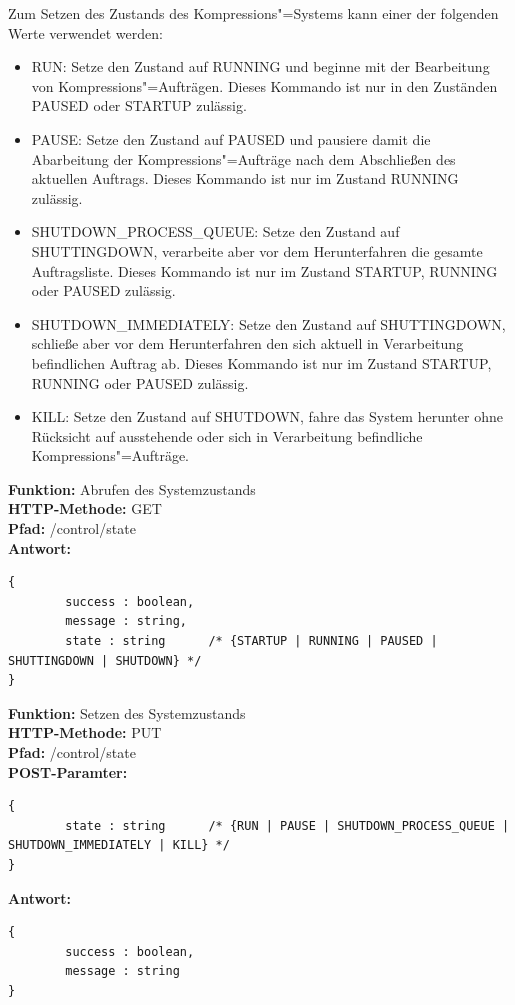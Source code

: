 Zum Setzen des Zustands des Kompressions"=Systems kann einer der folgenden Werte verwendet werden:
\begin{itemize}
\item {\ttfamily RUN:} Setze den Zustand auf {\ttfamily RUNNING} und beginne mit der Bearbeitung von Kompressions"=Aufträgen. Dieses Kommando ist nur in den Zuständen {\ttfamily PAUSED} oder {\ttfamily STARTUP} zulässig.
\item {\ttfamily PAUSE:} Setze den Zustand auf {\ttfamily PAUSED} und pausiere damit die Abarbeitung der Kompressions"=Aufträge nach dem Abschließen des aktuellen Auftrags. Dieses Kommando ist nur im Zustand {\ttfamily RUNNING} zulässig.
\item {\ttfamily SHUTDOWN\_PROCESS\_QUEUE:} Setze den Zustand auf {\ttfamily SHUTTINGDOWN}, verarbeite aber vor dem Herunterfahren die gesamte Auftragsliste. Dieses Kommando ist nur im Zustand {\ttfamily STARTUP}, {\ttfamily RUNNING} oder {\ttfamily PAUSED} zulässig.
\item {\ttfamily SHUTDOWN\_IMMEDIATELY:} Setze den Zustand auf {\ttfamily SHUTTINGDOWN}, schließe aber vor dem Herunterfahren den sich aktuell in Verarbeitung befindlichen Auftrag ab.  Dieses Kommando ist nur im Zustand {\ttfamily STARTUP}, {\ttfamily RUNNING} oder {\ttfamily PAUSED} zulässig.
\item {\ttfamily KILL}: Setze den Zustand auf {\ttfamily SHUTDOWN}, fahre das System herunter ohne Rücksicht auf ausstehende oder sich in Verarbeitung befindliche Kompressions"=Aufträge.
\end{itemize}

\noindent\textbf{Funktion: }Abrufen des Systemzustands \\
\textbf{HTTP-Methode: } {\ttfamily GET} \\
\textbf{Pfad: } {\ttfamily /control/state} \\
\textbf{Antwort: }
\begin{lstlisting}[caption={Antwort auf das Abrufen des Systemzustands}]
{
		success : boolean,
		message : string,
		state : string		/* {STARTUP | RUNNING | PAUSED | SHUTTINGDOWN | SHUTDOWN} */
}
\end{lstlisting}

\noindent\textbf{Funktion: }Setzen des Systemzustands \\
\textbf{HTTP-Methode: } {\ttfamily PUT} \\
\textbf{Pfad: } {\ttfamily /control/state} \\
\textbf{POST-Paramter: }
\begin{lstlisting}[caption={POST-Parameter zum Setzen des Systemzustands}]
{
		state : string   	/* {RUN | PAUSE | SHUTDOWN_PROCESS_QUEUE | SHUTDOWN_IMMEDIATELY | KILL} */
}
\end{lstlisting}
\textbf{Antwort: }
\begin{lstlisting}[caption={Antwort auf das Setzen des Systemzustands}]
{
		success : boolean,
		message : string
}
\end{lstlisting}

